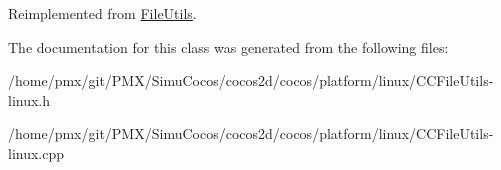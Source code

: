 Reimplemented from \hyperlink{classFileUtils_a2c891e99dc7af7343f4f9e8d4798a563}{File\+Utils}.



The documentation for this class was generated from the following files\+:\begin{DoxyCompactItemize}
\item 
/home/pmx/git/\+P\+M\+X/\+Simu\+Cocos/cocos2d/cocos/platform/linux/C\+C\+File\+Utils-\/linux.\+h\item 
/home/pmx/git/\+P\+M\+X/\+Simu\+Cocos/cocos2d/cocos/platform/linux/C\+C\+File\+Utils-\/linux.\+cpp\end{DoxyCompactItemize}
